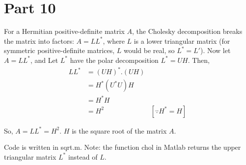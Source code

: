 \documentclass{article}
\begin{document}
\newpage
\section{Part 10}

\begin{flushleft}
For a Hermitian positive-definite matrix $A$, the Cholesky decomposition breaks the matrix into factors: $A = L L^*$, where $L$ is a lower triangular matrix (for symmetric positive-definite matrices, $L$ would be real, so $L^* = L'$). Now let $A = L L^*$, and Let $L^*$ have the polar decomposition $L^* = UH$. Then,
\begin{align*}
    LL^* &= (UH)^*.(UH)\\
    &= H^*(U^*U)H\\
    &= H^*H\\
    &= H^2  & [\because H^*=H]
\end{align*}

So, $A =LL^*= H^2$. $H$ is the square root of the matrix $A$.

Code is written in sqrt.m. Note: the function chol in Matlab returns the upper triangular matrix $L^*$ instead of $L$.
\end{flushleft}
\end{document}
